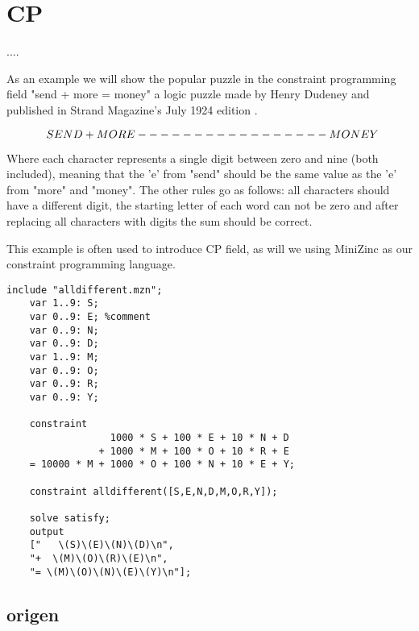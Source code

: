 \section{CP}
\label{CS:CP}
....


As an example we will show the popular puzzle in the constraint programming field "send + more = money" a logic puzzle made by Henry Dudeney and published in Strand Magazine's July 1924 edition \cite{sendMoreMoney}.
\begin{center}
	\[$$
	\; \; S E N D\\
	+ M O R E\\
	-----------------\\
	M O N E Y
	$$\]
\end{center}
Where each character represents a single digit between zero and nine (both included), meaning that the 'e' from "send" should be the same value as the 'e' from "more" and "money". The other rules go as follows: all characters should have a different digit, the starting letter of each word can not be zero and after replacing all characters with digits the sum should be correct. 

This example is often used to introduce CP field, as will we using MiniZinc as our constraint programming language. 

\label{lst:SendMoreMoney}
\begin{lstlisting}[language=minizinc, caption={Solution to "send+ more = money" modified from \url{https://www.minizinc.org/doc-2.5.5/en/downloads/send-more-money.mzn}}]
	include "alldifferent.mzn";
	var 1..9: S;
	var 0..9: E; %comment
	var 0..9: N;
	var 0..9: D;
	var 1..9: M;
	var 0..9: O;
	var 0..9: R;
	var 0..9: Y;
	
	constraint 
	              1000 * S + 100 * E + 10 * N + D
	            + 1000 * M + 100 * O + 10 * R + E
	= 10000 * M + 1000 * O + 100 * N + 10 * E + Y;
	
	constraint alldifferent([S,E,N,D,M,O,R,Y]);
	
	solve satisfy;
	output 
	["   \(S)\(E)\(N)\(D)\n",
	"+  \(M)\(O)\(R)\(E)\n",
	"= \(M)\(O)\(N)\(E)\(Y)\n"];
\end{lstlisting}


\cite{53marriott1998programming}

\subsection{origen}


